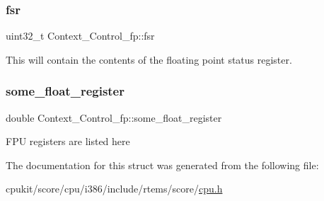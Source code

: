 \subsubsection{\texorpdfstring{fsr}{fsr}}
{\footnotesize\ttfamily uint32\+\_\+t Context\+\_\+\+Control\+\_\+fp\+::fsr}

This will contain the contents of the floating point status register. \mbox{\label{structContext__Control__fp_a931679ad648b2b4c8eb7943cae42c5da}} 
\subsubsection{\texorpdfstring{some\_float\_register}{some\_float\_register}}
{\footnotesize\ttfamily double Context\+\_\+\+Control\+\_\+fp\+::some\+\_\+float\+\_\+register}

F\+PU registers are listed here 

The documentation for this struct was generated from the following file\+:\begin{DoxyCompactItemize}
\item 
cpukit/score/cpu/i386/include/rtems/score/\mbox{\hyperlink{i386_2include_2rtems_2score_2cpu_8h}{cpu.\+h}}\end{DoxyCompactItemize}
